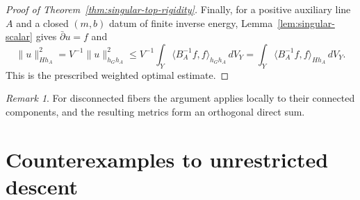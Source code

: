 \documentclass[11pt,reqno]{amsart}
\numberwithin{equation}{section}
\theoremstyle{definition}
\theoremstyle{remark}
\newtheorem{remark}[theorem]{Remark}
\begin{document}
\begin{proof}[Proof of Theorem~\ref{thm:singular-top-rigidity}]
Finally, for a positive auxiliary line $A$ and a closed $(m,b)$ datum
of finite inverse energy, Lemma~\ref{lem:singular-scalar} gives
$\bar\partial u=f$ and
\[
 \|u\|_{Hh_A}^2=V^{-1}\|u\|_{h_Gh_A}^2
 \leq V^{-1}\int_Y\langle B_A^{-1}f,f\rangle_{h_Gh_A}\,dV_Y
 =\int_Y\langle B_A^{-1}f,f\rangle_{Hh_A}\,dV_Y.
\]
This is the prescribed weighted optimal estimate.
\end{proof}

\begin{remark}\label{rem:top-singular-scope}
For disconnected fibers the argument applies locally to their connected
components, and the resulting metrics form an orthogonal direct sum.
\end{remark}

\section{Counterexamples to unrestricted descent}\label{sec:counterexamples}
\end{document}
